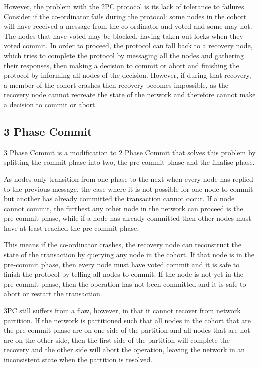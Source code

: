 \documentclass[12pt,twoside,notitlepage]{report}
\begin{document}
However, the problem with the 2PC protocol is its lack of tolerance to failures. Consider if the
co-ordinator fails during the protocol: some nodes in the cohort will have received a message from
the co-ordinator and voted and some may not. The nodes that have voted may be blocked, having
taken out locks when they voted commit. In order to proceed, the protocol can fall back to a
recovery node, which tries to complete the protocol by messaging all the nodes and gathering their
responses, then making a decision to commit or abort and finishing the protocol by informing all
nodes of the decision. However, if during that recovery, a member of the cohort crashes then
recovery becomes impossible, as the recovery node cannot recreate the state of the network and
therefore cannot make a decision to commit or abort.

\subsection*{3 Phase Commit}

3 Phase Commit is a modification to 2 Phase Commit that solves this problem by splitting the commit
phase into two, the pre-commit phase and the finalise phase.

As nodes only transition from one phase to the next when every node has replied to the previous
message, the case where it is not possible for one node to commit but another has already
committed the transaction cannot occur. If a node cannot commit, the furthest any other node in
the network can proceed is the pre-commit phase, while if a node has already committed then other
nodes must have at least reached the pre-commit phase.

This means if the co-ordinator crashes, the recovery node can reconstruct the state of the
transaction by querying any node in the
cohort. If that node is in the pre-commit phase, then every node must have voted commit and it is
safe to finish the protocol by telling all nodes to commit. If the node is not yet in the pre-commit
phase, then the operation has not been committed and it is safe to abort or restart the
transaction.

3PC still suffers from a flaw, however, in that it cannot recover from network partition. If the
network is partitioned such that all nodes in the cohort that are the pre-commit phase are on one
side of the partition and all nodes that are not are on the other side, then the first side of the
partition will complete the recovery and the other side will abort the operation, leaving the
network in an inconsistent state when the partition is resolved.
\end{document}
